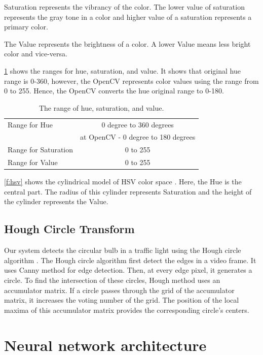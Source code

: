 Saturation represents the vibrancy of the color.
The lower value of saturation represents the gray tone in a color and higher value of a saturation represents a primary color.

The Value represents the brightness of a color.
A lower Value means less bright color and vice-versa.

\ref{t:hsv} shows the ranges for hue, saturation, and value.
It shows that original hue range is 0-360, however, the OpenCV \cite{opencv} represents color values using the range from 0 to 255. 
Hence, the OpenCV converts the hue original range to 0-180.

\begin{table}[h!]
  \centering
  \caption{The range of hue, saturation, and value.}
  \label{t:hsv}
  \begin{tabular}{  l  c  }
    \rowcolor{gray!50}
    \hline
    Range for Hue & 0 degree to 360 degrees \\
    \rowcolor{gray!50}    
    & at OpenCV - 0 degree to 180 degrees\\  
    Range for Saturation & 0 to 255 \\
    Range for Value & 0 to 255 \\
    \hline 
    
  \end{tabular}
\end{table}


\ref{f:hsv} shows the cylindrical model of HSV color space \cite{hsv}.
Here, the Hue is the central part.
The radius of this cylinder represents Saturation and the height of the cylinder represents the Value.

\subsection{Hough Circle Transform}
Our system detects the circular bulb in a traffic light using the Hough circle algorithm \cite{houghcir_alg}.
The Hough circle algorithm first detect the edges in a video frame.
It uses Canny method \cite{canny} for edge detection.
Then, at every edge pixel, it generates a circle.
To find the intersection of these circles, Hough method uses an accumulator matrix.
If a circle passes through the grid of the accumulator matrix, it increases the voting number of the grid.
The position of the local maxima of this accumulator matrix provides the corresponding circle's centers.

\section{Neural network architecture}

